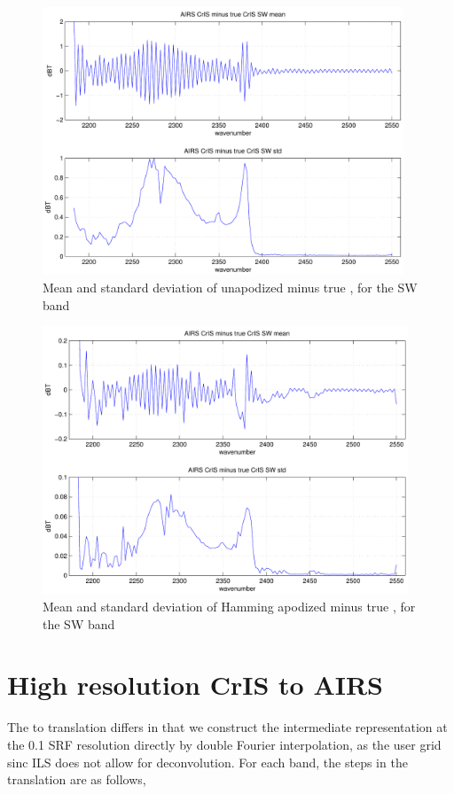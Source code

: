 \documentclass[12pt]{article}
\begin{document}
\begin{figure}
  \centering
  \includegraphics[height=8cm]{figures/airs_cris_diff_SW_noap.pdf}
  \caption{Mean and standard deviation of unapodized {\airs} {\cris}
    minus true {\cris}, for the {\cris} SW band }
  \label{acswd}
\end{figure}

\begin{figure}
  \centering
  \includegraphics[height=8cm]{figures/airs_cris_diff_SW_hamm.pdf}
  \caption{Mean and standard deviation of Hamming apodized {\airs}
      {\cris} minus true {\cris}, for the {\cris} SW band }
  \label{acswdh}
\end{figure}

\FloatBarrier

\section{High resolution CrIS to AIRS}

The {\cris} to {\airs} translation differs in that we construct the
intermediate representation at the 0.1 {\wn} {\airs} SRF resolution
directly by double Fourier interpolation, as the {\cris} user grid
sinc ILS does not allow for deconvolution.  For each {\cris} band,
the steps in the translation are as follows,
\end{document}
